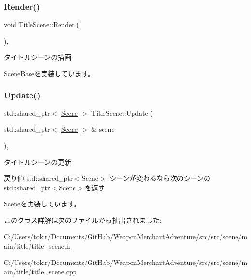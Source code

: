 \subsubsection{\texorpdfstring{Render()}{Render()}}
{\footnotesize\ttfamily void Title\+Scene\+::\+Render (\begin{DoxyParamCaption}{ }\end{DoxyParamCaption})\hspace{0.3cm}{\ttfamily [final]}, {\ttfamily [virtual]}}



タイトルシーンの描画 



\mbox{\hyperlink{class_scene_base_ad981674ce731ea267f398e889bbb9dc3}{Scene\+Base}}を実装しています。

\mbox{\label{class_title_scene_ab3097e96e2fe65d6fad0d6bb45a14f9f}} 
\subsubsection{\texorpdfstring{Update()}{Update()}}
{\footnotesize\ttfamily std\+::shared\+\_\+ptr$<$ \mbox{\hyperlink{class_scene}{Scene}} $>$ Title\+Scene\+::\+Update (\begin{DoxyParamCaption}\item[{std\+::shared\+\_\+ptr$<$ \mbox{\hyperlink{class_scene}{Scene}} $>$ \&}]{scene }\end{DoxyParamCaption})\hspace{0.3cm}{\ttfamily [final]}, {\ttfamily [virtual]}}



タイトルシーンの更新 

\begin{DoxyReturn}{戻り値}
std\+::shared\+\_\+ptr$<$\+Scene$>$ シーンが変わるなら次のシーンのstd\+::shared\+\_\+ptr$<$\+Scene$>$を返す 
\end{DoxyReturn}


\mbox{\hyperlink{class_scene_ab71ee5f19764b90c87b4574aa1cb1d25}{Scene}}を実装しています。



このクラス詳解は次のファイルから抽出されました\+:\begin{DoxyCompactItemize}
\item 
C\+:/\+Users/tokir/\+Documents/\+Git\+Hub/\+Weapon\+Merchant\+Adventure/src/src/scene/main/title/\mbox{\hyperlink{title__scene_8h}{title\+\_\+scene.\+h}}\item 
C\+:/\+Users/tokir/\+Documents/\+Git\+Hub/\+Weapon\+Merchant\+Adventure/src/src/scene/main/title/\mbox{\hyperlink{title__scene_8cpp}{title\+\_\+scene.\+cpp}}\end{DoxyCompactItemize}
